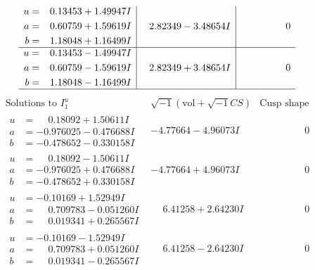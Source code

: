 \documentclass[1p]{elsarticle_modified}
\theoremstyle{definition}
\newcommand{\I}{\sqrt{-1}}
\begin{document}
$$\begin{array}{c|c|c}
\begin{aligned}
u &= \phantom{-}0.13453 + 1.49947 I \\
a &= \phantom{-}0.60759 + 1.59619 I \\
b &= \phantom{-}1.18048 + 1.16499 I\end{aligned}
 & \phantom{-}2.82349 - 3.48654 I & \phantom{-0.000000 } 0 \\ \hline\begin{aligned}
u &= \phantom{-}0.13453 - 1.49947 I \\
a &= \phantom{-}0.60759 - 1.59619 I \\
b &= \phantom{-}1.18048 - 1.16499 I\end{aligned}
 & \phantom{-}2.82349 + 3.48654 I & \phantom{-0.000000 } 0\\
 \hline 
 \end{array}$$\newpage$$\begin{array}{c|c|c}  
\text{Solutions to }I^u_{1}& \I (\text{vol} + \sqrt{-1}CS) & \text{Cusp shape}\\
 \hline 
\begin{aligned}
u &= \phantom{-}0.18092 + 1.50611 I \\
a &= -0.976025 - 0.476688 I \\
b &= -0.478652 - 0.330158 I\end{aligned}
 & -4.77664 - 4.96073 I & \phantom{-0.000000 } 0 \\ \hline\begin{aligned}
u &= \phantom{-}0.18092 - 1.50611 I \\
a &= -0.976025 + 0.476688 I \\
b &= -0.478652 + 0.330158 I\end{aligned}
 & -4.77664 + 4.96073 I & \phantom{-0.000000 } 0 \\ \hline\begin{aligned}
u &= -0.10169 + 1.52949 I \\
a &= \phantom{-}0.709783 - 0.051260 I \\
b &= \phantom{-}0.019341 + 0.265567 I\end{aligned}
 & \phantom{-}6.41258 + 2.64230 I & \phantom{-0.000000 } 0 \\ \hline\begin{aligned}
u &= -0.10169 - 1.52949 I \\
a &= \phantom{-}0.709783 + 0.051260 I \\
b &= \phantom{-}0.019341 - 0.265567 I\end{aligned}
 & \phantom{-}6.41258 - 2.64230 I & \phantom{-0.000000 } 0 \\ \hline\begin{aligned}

\end{aligned}
\end{array}$$
\end{document}

